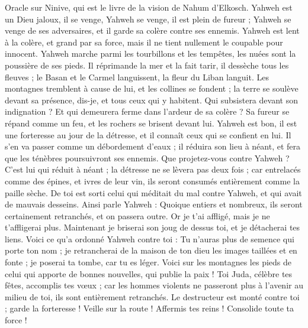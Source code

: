 \begin{multicols}{2}
\VerseOne{}Oracle sur Ninive, qui est le livre de la vision de Nahum d'Elkosch.
Yahweh est un Dieu jaloux, il se venge, Yahweh se venge, il est plein de fureur ; Yahweh se venge de ses adversaires, et il garde sa colère contre ses ennemis.
Yahweh est lent à la colère, et grand par sa force, mais il ne tient nullement le coupable pour innocent. Yahweh marche parmi les tourbillons et les tempêtes, les nuées sont la poussière de ses pieds.
Il réprimande la mer et la fait tarir, il dessèche tous les fleuves ; le Basan et le Carmel languissent, la fleur du Liban languit.
Les montagnes tremblent à cause de lui, et les collines se fondent ; la terre se soulève devant sa présence, dis-je, et tous ceux qui y habitent.
Qui subsistera devant son indignation ? Et qui demeurera ferme dans l'ardeur de sa colère ? Sa fureur se répand comme un feu, et les rochers se brisent devant lui.
Yahweh est bon, il est une forteresse au jour de la détresse, et il connaît ceux qui se confient en lui.
Il s'en va passer comme un débordement d'eaux ; il réduira son lieu à néant, et fera que les ténèbres poursuivront ses ennemis.
Que projetez-vous contre Yahweh ? C'est lui qui réduit à néant ; la détresse ne se lèvera pas deux fois ;
car entrelacés comme des épines, et ivres de leur vin, ils seront consumés entièrement comme la paille sèche.
De toi est sorti celui qui méditait du mal contre Yahweh, et qui avait de mauvais desseins.
Ainsi parle Yahweh : Quoique entiers et nombreux, ils seront certainement retranchés, et on passera outre. Or je t'ai affligé, mais je ne t'affligerai plus.
Maintenant je briserai son joug de dessus toi, et je détacherai tes liens.
Voici ce qu'a ordonné Yahweh contre toi : Tu n'auras plus de semence qui porte ton nom ; je retrancherai de la maison de ton dieu les images taillées et en fonte ; je poserai ta tombe, car tu es léger.
\VerseOne{}Voici sur les montagnes les pieds de celui qui apporte de bonnes nouvelles, qui publie la paix ! Toi Juda, célèbre tes fêtes, accomplis tes vœux ; car les hommes violents ne passeront plus à l'avenir au milieu de toi, ils sont entièrement retranchés.
Le destructeur est monté contre toi ; garde la forteresse ! Veille sur la route ! Affermis tes reins ! Consolide toute ta force !

\end{multicols}
